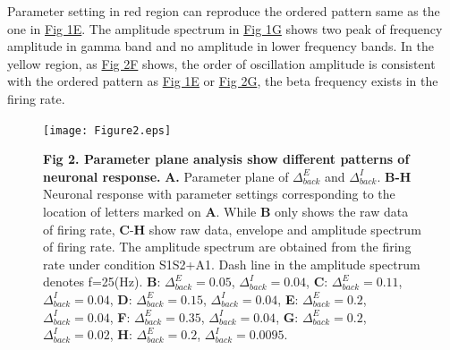 \documentclass[10pt,letterpaper]{article}
\begin{document}
Parameter setting in red region can reproduce the ordered pattern same as the one in \hyperlink{fig:fig1}{Fig 1E}. The amplitude spectrum in \hyperlink{fig:fig2}{Fig 1G} shows two peak of frequency amplitude in gamma band and no amplitude in lower frequency bands.
In the yellow region, as \hyperlink{fig:fig2}{Fig 2F} shows, the order of oscillation amplitude is consistent with the ordered pattern as \hyperlink{fig:fig1}{Fig 1E} or \hyperlink{fig:fig2}{Fig 2G}, the beta frequency exists in the firing rate.

\begin{figure}[!h]
\begin{adjustwidth}{-2in}{0.3in} %
\centering
\texttt{[image: Figure2.eps]}
\begin{flushleft} {\bf Fig 2. Parameter plane analysis show different patterns of neuronal response.}
\textbf{A.} Parameter plane of $\Delta_{back}^{E}$ and $\Delta_{back}^{I}$. \textbf{B-H} Neuronal response with parameter settings corresponding to the location of letters marked on \textbf{A}. While \textbf{B} only shows the raw data of firing rate, \textbf{C}-\textbf{H} show raw data, envelope and amplitude spectrum of firing rate. The amplitude spectrum are obtained from the firing rate under condition S1S2+A1. Dash line in the amplitude spectrum denotes f=25(Hz). \textbf{B}: $\Delta_{back}^{E}=0.05$, $\Delta_{back}^{I}=0.04$, \textbf{C}: $\Delta_{back}^{E}=0.11$, $\Delta_{back}^{I}=0.04$, \textbf{D}: $\Delta_{back}^{E}=0.15$, $\Delta_{back}^{I}=0.04$, \textbf{E}: $\Delta_{back}^{E}=0.2$, $\Delta_{back}^{I}=0.04$, \textbf{F}: $\Delta_{back}^{E}=0.35$, $\Delta_{back}^{I}=0.04$, \textbf{G}: $\Delta_{back}^{E}=0.2$, $\Delta_{back}^{I}=0.02$, \textbf{H}: $\Delta_{back}^{E}=0.2$, $\Delta_{back}^{I}=0.0095$. 
\end{flushleft}
\hypertarget{fig:fig2}{}
\end{adjustwidth}
\end{figure}
\end{document}
